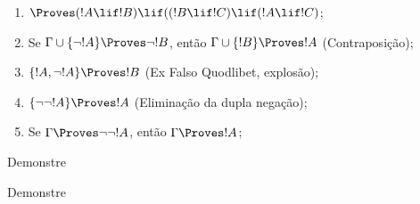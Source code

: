 \documentclass[../../../include/open-logic-section]{subfiles}
\begin{document}
\begin{prop}
\begin{enumerate}
\item $\Proves (!A \lif !B) \lif ((!B \lif !C)
  \lif (!A \lif !C)$; 
\item Se $\Gamma \cup \{ \lnot !A\}
  \Proves \lnot !B$, então $\Gamma \cup \{ !B\} \Proves
  !A$ (Contraposição); 
\item  $\{ !A, \lnot!A\} \Proves
    !B$ (Ex Falso Quodlibet, explosão); 
\item  $\{ \lnot\lnot!A\} \Proves
  !A$ (Eliminação da dupla negação);
\item Se $\Gamma \Proves \lnot\lnot!A$, então $\Gamma \Proves
  !A$;
\end{enumerate}
\end{prop}

\begin{prob}
  Demonstre 
\end{prob}
\tagendprob

\begin{prob}
  Demonstre 
\end{prob}
\tagendprob
\end{document}
